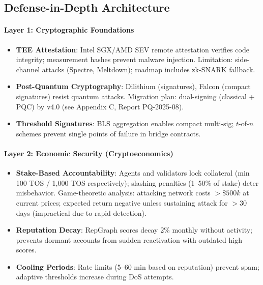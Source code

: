 \documentclass[11pt]{article}
\begin{document}
\subsection{Defense-in-Depth Architecture}

\paragraph{Layer 1: Cryptographic Foundations}
\begin{itemize}[noitemsep]
  \item \textbf{TEE Attestation}: Intel SGX/AMD SEV remote attestation verifies code integrity; measurement hashes prevent malware injection. Limitation: side-channel attacks (Spectre, Meltdown); roadmap includes zk-SNARK fallback.
  \item \textbf{Post-Quantum Cryptography}: Dilithium (signatures), Falcon (compact signatures) resist quantum attacks. Migration plan: dual-signing (classical + PQC) by v4.0 (see Appendix C, Report PQ-2025-08).
  \item \textbf{Threshold Signatures}: BLS aggregation enables compact multi-sig; $t$-of-$n$ schemes prevent single points of failure in bridge contracts.
\end{itemize}

\paragraph{Layer 2: Economic Security (Cryptoeconomics)}
\begin{itemize}[noitemsep]
  \item \textbf{Stake-Based Accountability}: Agents and validators lock collateral (min 100 TOS / 1,000 TOS respectively); slashing penalties (1--50\% of stake) deter misbehavior. Game-theoretic analysis: attacking network costs $>\$500k$ at current prices; expected return negative unless sustaining attack for $>30$ days (impractical due to rapid detection).
  \item \textbf{Reputation Decay}: RepGraph scores decay 2\% monthly without activity; prevents dormant accounts from sudden reactivation with outdated high scores.
  \item \textbf{Cooling Periods}: Rate limits (5--60 min based on reputation) prevent spam; adaptive thresholds increase during DoS attempts.
\end{itemize}
\end{document}
